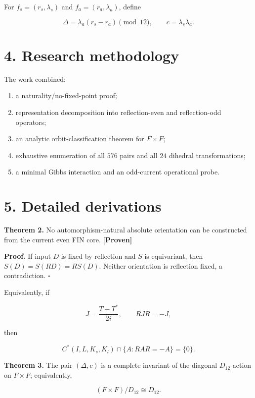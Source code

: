\documentclass[11pt,a4paper,openany]{report}
\newcommand{\statusProven}{\textcolor{fingreen}{[Proven]}}
\begin{document}
For \(f_s=(r_s,\lambda_s)\) and \(f_a=(r_a,\lambda_a)\), define

\[
\Delta=\lambda_a(r_s-r_a)\pmod {12},
\qquad c=\lambda_s\lambda_a.
\]

\section{4. Research methodology}

The work combined:

\begin{enumerate}
\item 
a naturality/\allowbreak{}no-fixed-point proof;

\item 
representation decomposition into reflection-even and reflection-odd operators;

\item 
an analytic orbit-classification theorem for \(F\times F\);

\item 
exhaustive enumeration of all \(576\) pairs and all \(24\) dihedral transformations;

\item 
a minimal Gibbs interaction and an odd-current operational probe.

\end{enumerate}

\section{5. Detailed derivations}

\textbf{Theorem 2.} No automorphism-natural absolute orientation can be constructed from the current even FIN core. \textbf{\statusProven{}}

\textbf{Proof.} If input \(D\) is fixed by reflection and \(S\) is equivariant, then \(S(D)=S(RD)=R S(D)\). Neither orientation is reflection fixed, a contradiction. \(\square\)

Equivalently, if

\[
J=\frac{T-T^*}{2i},\qquad RJR=-J,
\]

then

\[
C^*(I,L,K_s,K_l)\cap\{A:RAR=-A\}=\{0\}.
\]

\textbf{Theorem 3.} The pair \((\Delta,c)\) is a complete invariant of the diagonal \(D_{12}\)-action on \(F\times F\); equivalently,

\[
(F\times F)/D_{12}\cong D_{12}.
\]
\end{document}

